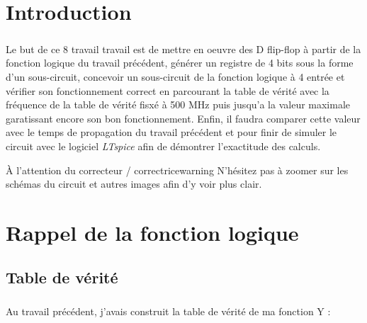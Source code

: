 \section{Introduction}

    \subparagraph{}Le but de ce {\color{info}8\ieme{} travail} travail est de mettre en oeuvre des D flip-flop à partir
     de la fonction logique du travail précédent, générer un registre de 4 bits sous la forme d'un sous-circuit, 
     concevoir un sous-circuit de la fonction logique à 4 entrée et vérifier son fonctionnement correct en parcourant 
     la table de vérité avec la fréquence de la table de vérité fisxé à 500 MHz puis jusqu'a la valeur maximale 
     garatissant encore son bon fonctionnement. Enfin, il faudra comparer cette valeur avec le temps de propagation du
      travail précédent et pour finir de 
    simuler le circuit avec le logiciel \textit{LTspice} afin de démontrer l'exactitude des calculs.\\[1.5cm]
    
    \begin{titletbox}{À l'attention du correcteur / correctrice}{warning}
        N'hésitez pas à zoomer sur les schémas du circuit et autres images afin d'y voir plus clair.
    \end{titletbox}

    \section{Rappel de la fonction logique}

    \subsection{Table de vérité}
    
        \subparagraph{}Au travail précédent, j'avais construit la table de vérité de ma fonction Y :
        
